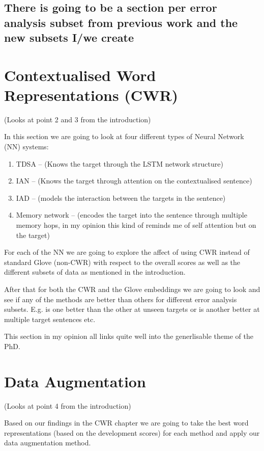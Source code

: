 \subsection{There is going to be a section per error analysis subset from previous work and the new subsets I/we create}

\section{Contextualised Word Representations (CWR)}
(Looks at point 2 and 3 from the introduction)

In this section we are going to look at four different types of Neural Network (NN) systems:
\begin{enumerate}
    \item TDSA -- (Knows the target through the LSTM network structure)
    \item IAN -- (Knows the target through attention on the contextualised sentence)
    \item IAD -- (models the interaction between the targets in the sentence)
    \item Memory network -- (encodes the target into the sentence through multiple memory hops, in my opinion this kind of reminds me of self attention but on the target)
\end{enumerate}

For each of the NN we are going to explore the affect of using CWR instead of standard Glove (non-CWR) with respect to the overall scores as well as the different subsets of data as mentioned in the introduction.

After that for both the CWR and the Glove embeddings we are going to look and see if any of the methods are better than others for different error analysis subsets. E.g. is one better than the other at unseen targets or is another better at multiple target sentences etc.

This section in my opinion all links quite well into the generlisable theme of the PhD.

\section{Data Augmentation}
(Looks at point 4 from the introduction)

Based on our findings in the CWR chapter we are going to take the best word representations (based on the development scores) for each method and apply our data augmentation method.

